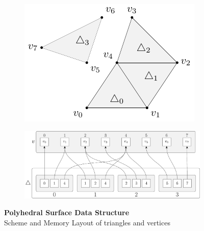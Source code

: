\documentclass{stdlocal}
\begin{document}
  \begin{figure}[h]
    \centering
    \begin{subfigure}[c]{0.35\linewidth}
      \centering
      \includegraphics[width=\linewidth]{figures/polyhedral-surface-struct-base-scheme.pdf}
    \end{subfigure}
    \hfill
    \begin{subfigure}[c]{0.63\linewidth}
      \centering
      \includegraphics[width=\linewidth]{figures/polyhedral-surface-struct-base.pdf}
    \end{subfigure}
    \caption[Polyhedral Surface Data Structure]{%
      \textbf{Polyhedral Surface Data Structure}\\
      Scheme and Memory Layout of triangles and vertices
    }
  \end{figure}
\end{document}

